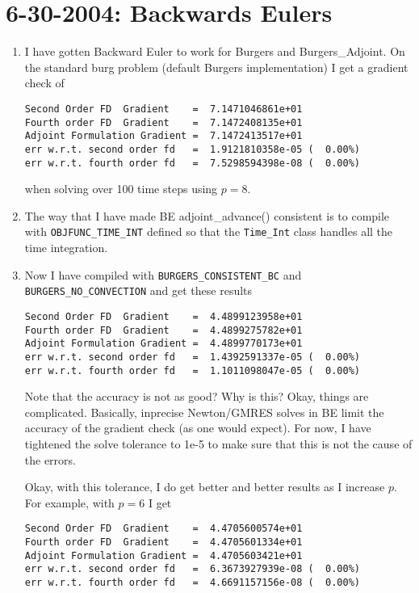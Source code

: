\documentclass[12pt]{article}
\begin{document}
\section*{6-30-2004:  Backwards Eulers}
\begin{enumerate}

\item I have gotten Backward Euler to work for Burgers and Burgers\_Adjoint.
  On the standard burg problem (default Burgers implementation) I get a
  gradient check of
\begin{verbatim}
Second Order FD  Gradient    =  7.1471046861e+01
Fourth order FD  Gradient    =  7.1472408135e+01
Adjoint Formulation Gradient =  7.1472413517e+01
err w.r.t. second order fd   =  1.9121810358e-05 (  0.00%)
err w.r.t. fourth order fd   =  7.5298594398e-08 (  0.00%)
\end{verbatim}
when solving over 100 time steps using $p=8$.

\item The way that I have made BE adjoint\_advance() consistent is to compile
  with {\tt OBJFUNC\_TIME\_INT} defined so that the {\tt Time\_Int} class
  handles all the time integration.

\item Now I have compiled with {\tt BURGERS\_CONSISTENT\_BC} and {\tt
  BURGERS\_NO\_CONVECTION} and get these results
\begin{verbatim}
Second Order FD  Gradient    =  4.4899123958e+01
Fourth order FD  Gradient    =  4.4899275782e+01
Adjoint Formulation Gradient =  4.4899770173e+01
err w.r.t. second order fd   =  1.4392591337e-05 (  0.00%)
err w.r.t. fourth order fd   =  1.1011098047e-05 (  0.00%)
\end{verbatim}
Note that the accuracy is not as good?  Why is this?  Okay, things are
complicated.  Basically, inprecise Newton/GMRES solves in BE limit the
accuracy of the gradient check (as one would expect).  For now, I have
tightened the solve tolerance to 1e-5 to make sure that this is not the cause
of the errors.

Okay, with this tolerance, I do get better and better results as I increase
$p$.  For example, with $p=6$ I get
\begin{verbatim}
Second Order FD  Gradient    =  4.4705600574e+01
Fourth order FD  Gradient    =  4.4705601334e+01
Adjoint Formulation Gradient =  4.4705603421e+01
err w.r.t. second order fd   =  6.3673927939e-08 (  0.00%)
err w.r.t. fourth order fd   =  4.6691157156e-08 (  0.00%)
\end{verbatim}


\end{enumerate}
\end{document}
